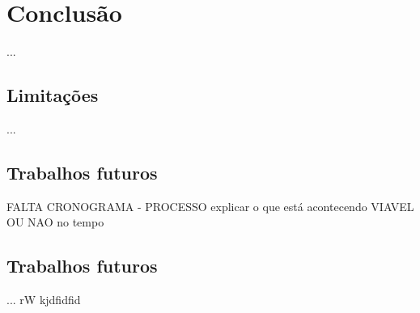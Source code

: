 \chapter{Conclusão}\label{chap:conclusao}
...

\section{Limitações}\label{chap:conclusao:limitacao}
...

\section{Trabalhos futuros}\label{chap:conclusao:futuro}

\cite{Guidotti2018}
FALTA CRONOGRAMA - PROCESSO explicar o que está acontecendo VIAVEL OU NAO no tempo

\section{Trabalhos futuros}\label{chap:conclusao:futuro2}
...
rW
\citealp*{Ribeiro:2016:WIT:2939672.2939778}kjdfidfid